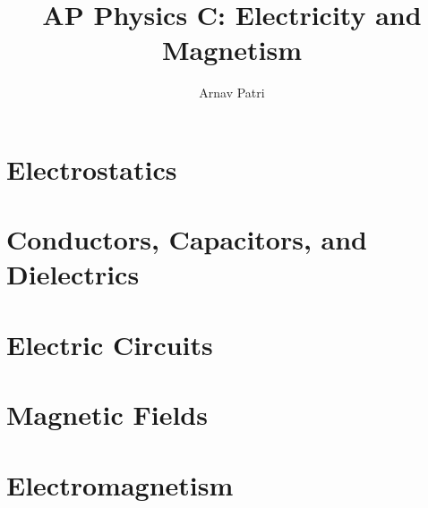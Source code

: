 \documentclass[A4, 12pt]{report}
\title{AP Physics C: Electricity and Magnetism}
\author{Arnav Patri}
\begin{document}
	\maketitle
	\chapter{Electrostatics}
		
	\chapter{Conductors, Capacitors, and Dielectrics}
		
	\chapter{Electric Circuits}
		
	\chapter{Magnetic Fields}
		
	\chapter{Electromagnetism}
		
\end{document}
